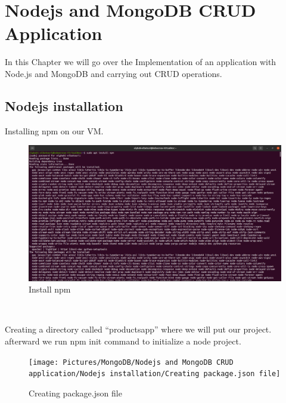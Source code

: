 \chapter{Nodejs and MongoDB CRUD Application}
\par In this Chapter we will go over the Implementation of an application with Node.js and MongoDB and
carrying out CRUD operations.
\begin{spacing}{1.2}
\section{Nodejs installation }
\par Installing npm on our VM.
\\
\begin{figure}[!htb] 
\begin{center} 
\includegraphics[width=1\linewidth]{Pictures/MongoDB/Nodejs and MongoDB CRUD application/Nodejs installation/Install npm} 
\end{center} 
\caption{Install npm} 
\end{figure}  \FloatBarrier
\\
\newpage
\par Creating a directory called “productsapp” where we will put our project. afterward we run npm init command to initialize a node project. 
\\
\begin{figure}[!htb] 
\begin{center} 
\texttt{[image: Pictures/MongoDB/Nodejs and MongoDB CRUD  application/Nodejs installation/Creating package.json file]} 
\end{center} 
\caption{Creating package.json file} 
\end{figure}  \FloatBarrier
\\


\end{spacing}
